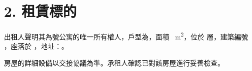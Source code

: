 \section*{2. 租賃標的}
出租人聲明其為\Propunitnumber 號公寓的唯一所有權人，戶型為\Propdisposition，面積 \Propaream~m\textsuperscript{2}，位於 \Propfloor 層，建築編號 \Propbuildingnumber，座落於 \Propcadastralterritory，地址：\Propaddress。

房屋的詳細設備以交接協議為準。承租人確認已對該房屋進行妥善檢查。
